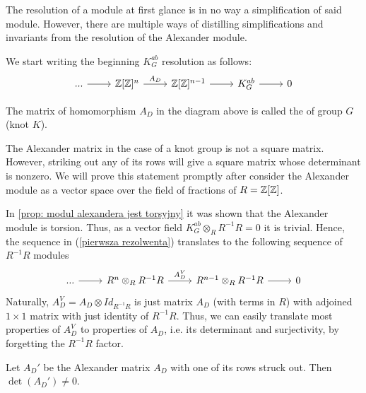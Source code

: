 The resolution of a module at first glance is in no way a simplification of said module. However, there are multiple ways of distilling simplifications and invariants from the resolution of the Alexander module. 

We start writing the beginning $K_G^{ab}$ resolution as follows:
\begin{equation}\label{pierwsza rezolwenta}
  \begin{tikzcd}
    ...\arrow[r] & \Z[\Z]^{n}\arrow[r, "A_D"] & \Z[\Z]^{n-1}\arrow[r] & K_G^{ab}\arrow[r] & 0
  \end{tikzcd}
\end{equation}


\begin{definition}\label{alexander matrixi def}
  The matrix of homomorphism $A_D$ in the diagram above is called the  of group $G$ (knot $K$).
\end{definition}

The Alexander matrix in the case of a knot group is not a square matrix. However, striking out any of its rows will give a square matrix whose determinant is nonzero. We will prove this statement promptly after consider the Alexander module as a vector space over the field of fractions of $R=\operatorname{\mathbb{Z}}[\operatorname{\mathbb{Z}}]$.

In \cref{prop: modul alexandera jest torsyjny} it was shown that the Alexander module is torsion. Thus, as a vector field $K_G^{ab}\otimes_R R^{-1}R=0$ it is trivial. Hence, the sequence in (\ref{pierwsza rezolwenta}) translates to the following sequence of $R^{-1}R$ modules
\begin{equation}\label{resolution vector spaces}
  \begin{tikzcd}
    ...\arrow[r] & R^n\otimes_R R^{-1}R \arrow[r, "A_D^V"] & R^{n-1}\otimes_R R^{-1}R \arrow[r] & 0
  \end{tikzcd}
\end{equation}
Naturally, $A_D^V=A_D\otimes Id_{R^{-1}R}$ is just matrix $A_D$ (with terms in $R$) with adjoined $1\times 1$ matrix with just identity of $R^{-1}R$. Thus, we can easily translate most properties of $A_D^V$ to properties of $A_D$, i.e. its determinant and surjectivity, by forgetting the $R^{-1}R$ factor.

\begin{proposition}\label{alexander matrix has trivial kernel}
  Let $A_D'$ be the Alexander matrix $A_D$ with one of its rows struck out. Then $\det(A_D')\neq 0$.
\end{proposition}

